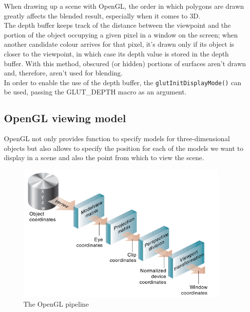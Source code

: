 When drawing up a scene with OpenGL, the order in which polygons are drawn
greatly affects the blended result, especially when it comes to 3D.
\\
The depth buffer keeps track of the distance between the viewpoint and 
the portion of the object occupying a given pixel in a window on the 
screen; when another candidate colour arrives for that pixel, it's drawn 
only if its object is closer to the viewpoint, in which case its depth
value is stored in the depth buffer. With this method, obscured (or hidden)
portions of surfaces aren't drawn and, therefore, aren't used for
blending.
\\
In order to enable the use of the depth buffer, the 
\texttt{glutInitDisplayMode()} can be used, passing the 
GLUT\_DEPTH macro as an argument.

\subsection{OpenGL viewing model}
\label{opengl:opengl_note:viewing_model}

OpenGL not only provides function to specify models for 
three-dimensional objects but also allows to specify the 
position for each of the models we want to display in a 
scene and also the point from which to view the scene.

\begin{figure}[!h]
  \begin{center}
    \includegraphics[width=300pt]{img/openGLpipe.png}
    \caption{The OpenGL pipeline}
    \label{fig:openglpipe}
  \end{center}
\end{figure}

